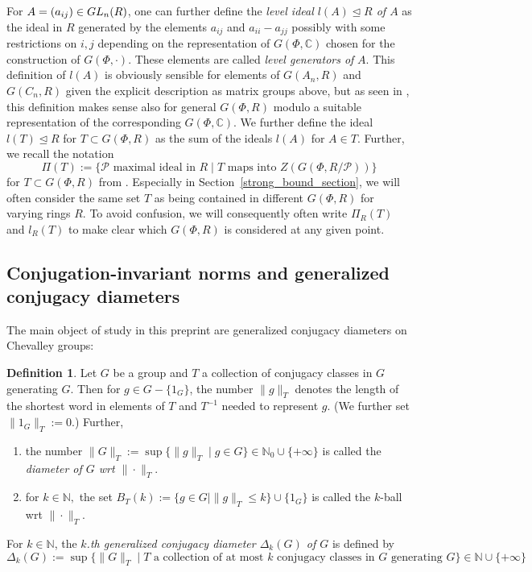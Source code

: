\documentclass[12pt]{amsart}
\newcommand{\C}[1]{{\mathcal #1}}
\theoremstyle{definition}\newtheorem{definition}[theorem]{Definition}
\theoremstyle{remark}\newtheorem{remark}[theorem]{Remark}
\theoremstyle{definition}\newtheorem{case}{Case}
\begin{document}
For $A=(a_{ij})\in{\rm GL}_n(R)$, one can further define the \emph{level ideal $l(A)\unlhd R$ of $A$} as the ideal in $R$ generated by the elements $a_{ij}$ and $a_{ii}-a_{jj}$ possibly with some restrictions on $i,j$ depending on the representation of $G(\Phi,\mathbb{C})$ chosen for the construction of $G(\Phi,\cdot)$. These elements are called \emph{level generators of }$A.$ This definition of $l(A)$ is obviously sensible for elements of $G(A_n,R)$ and $G(C_n,R)$ given the explicit description as matrix groups above, but as seen in \cite[Section~2]{General_strong_bound}, this definition makes sense also for general $G(\Phi,R)$ modulo a suitable representation of the corresponding $G(\Phi,\mathbb{C})$. We further define the ideal $l(T)\unlhd R$ for $T\subset G(\Phi,R)$ as the sum of the ideals $l(A)$ for $A\in T.$ Further, we recall the notation 
\[
\Pi(T):=\{\C P\text{ maximal ideal in }R\mid T\text{ maps into }Z\left(G(\Phi,R/\C P)\right)\}
\]
for $T\subset G(\Phi,R)$ from \cite{General_strong_bound}. Especially in Section~\ref{strong_bound_section}, we will often consider the same set $T$ as being contained in different $G(\Phi,R)$ for varying rings $R.$ To avoid confusion, we will consequently often write $\Pi_R(T)$ and $l_R(T)$ to make clear which $G(\Phi,R)$ is considered at any given point. 

\subsection{Conjugation-invariant norms and generalized conjugacy diameters}

The main object of study in this preprint are generalized conjugacy diameters on Chevalley groups:

\begin{definition}\cite[P.~1]{KLM}
Let $G$ be a group and $T$ a collection of conjugacy classes in $G$ generating $G.$ Then for $g\in G-\{1_G\}$, the number $\|g\|_T$ denotes the length of the shortest word in elements of $T$ and $T^{-1}$ needed to represent $g.$ (We further set $\|1_G\|_T:=0.$) Further, 
\begin{enumerate}
\item the number $\|G\|_T:=\sup\{\|g\|_T\mid g\in G\}\in\mathbb{N}_0\cup\{+\infty\}$ is called the \emph{diameter of $G$ wrt $\|\cdot\|_T$}. 
\item for $k\in\mathbb{N},$ the set $B_T(k):=\{g\in G\mid \|g\|_T\leq k\}\cup\{1_G\}$ is called the $k$-ball wrt $\|\cdot\|_T.$
\end{enumerate}
For $k\in\mathbb{N}$, the \emph{$k$.th generalized conjugacy diameter $\Delta_k(G)$ of $G$} is defined by 
\[
\Delta_k(G):=\sup\{\|G\|_T\mid T\text{ a collection of at most }k\text{ conjugacy classes in }G\text{ generating }G\}\in\mathbb{N}\cup\{+\infty\}
\]
\end{definition}
\end{document}
